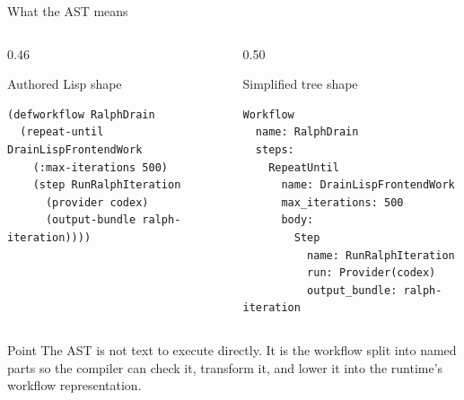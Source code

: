 \documentclass[aspectratio=169]{beamer}
\begin{document}
\begin{frame}[fragile]{What the AST means}
\small
\begin{columns}[T,totalwidth=\textwidth]
\begin{column}{0.46\textwidth}
\begin{block}{Authored Lisp shape}
\begin{lstlisting}[basicstyle=\ttfamily\scriptsize]
(defworkflow RalphDrain
  (repeat-until DrainLispFrontendWork
    (:max-iterations 500)
    (step RunRalphIteration
      (provider codex)
      (output-bundle ralph-iteration))))
\end{lstlisting}
\end{block}
\end{column}
\begin{column}{0.50\textwidth}
\begin{block}{Simplified tree shape}
\begin{lstlisting}[basicstyle=\ttfamily\scriptsize]
Workflow
  name: RalphDrain
  steps:
    RepeatUntil
      name: DrainLispFrontendWork
      max_iterations: 500
      body:
        Step
          name: RunRalphIteration
          run: Provider(codex)
          output_bundle: ralph-iteration
\end{lstlisting}
\end{block}
\end{column}
\end{columns}
\vspace{0.4em}
\begin{block}{Point}
\footnotesize
The AST is not text to execute directly. It is the workflow split into named parts so the compiler can check it, transform it, and lower it into the runtime's workflow representation.
\end{block}
\end{frame}
\end{document}
